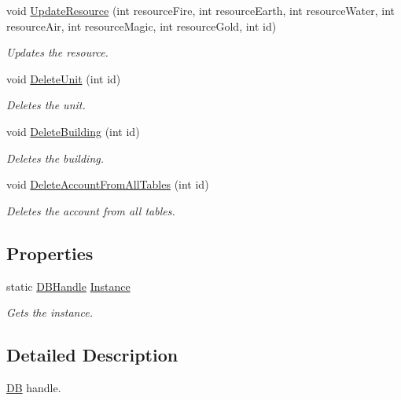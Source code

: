 \begin{DoxyCompactItemize}
void \hyperlink{classServer_1_1DB_1_1DBHandle_adb1e25286be25397801361b8ef3c7c9d}{Update\+Resource} (int resource\+Fire, int resource\+Earth, int resource\+Water, int resource\+Air, int resource\+Magic, int resource\+Gold, int id)
\begin{DoxyCompactList}\small\item\em Updates the resource. \end{DoxyCompactList}\item 
void \hyperlink{classServer_1_1DB_1_1DBHandle_a149e5c4a88f7abebe3039ec647c97b00}{Delete\+Unit} (int id)
\begin{DoxyCompactList}\small\item\em Deletes the unit. \end{DoxyCompactList}\item 
void \hyperlink{classServer_1_1DB_1_1DBHandle_a7e3257d50f7e4ae4d2cde720a336711e}{Delete\+Building} (int id)
\begin{DoxyCompactList}\small\item\em Deletes the building. \end{DoxyCompactList}\item 
void \hyperlink{classServer_1_1DB_1_1DBHandle_a6401b9d859f8c7852fd1fb8d08fbcab5}{Delete\+Account\+From\+All\+Tables} (int id)
\begin{DoxyCompactList}\small\item\em Deletes the account from all tables. \end{DoxyCompactList}\end{DoxyCompactItemize}
\subsection*{Properties}
\begin{DoxyCompactItemize}
\item 
static \hyperlink{classServer_1_1DB_1_1DBHandle}{D\+B\+Handle} \hyperlink{classServer_1_1DB_1_1DBHandle_a1809fac85ce06cf9e7f400ac4648051e}{Instance}
\begin{DoxyCompactList}\small\item\em Gets the instance. \end{DoxyCompactList}\end{DoxyCompactItemize}


\subsection{Detailed Description}
\hyperlink{namespaceServer_1_1DB}{D\+B} handle. 



